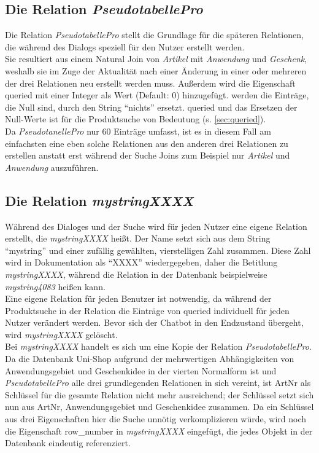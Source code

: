 \subsection{Die Relation \textit{PseudotabellePro}}
\label{sec:PseudotabellePro}
Die Relation \textit{PseudotabellePro} stellt die Grundlage für die späteren Relationen, die während des Dialogs speziell für den Nutzer erstellt werden.\\
Sie resultiert aus einem Natural Join von \textit{Artikel} mit \textit{Anwendung} und \textit{Geschenk}, weshalb sie im Zuge der Aktualität nach einer Änderung in einer oder mehreren der drei Relationen neu erstellt werden muss. Außerdem wird die Eigenschaft queried mit einer Integer als Wert (Default: 0) hinzugefügt. 
werden die Einträge, die Null sind, durch den String "`nichts"' ersetzt. queried und das Ersetzen der Null-Werte ist für die Produktsuche von Bedeutung (s. \ref{sec:queried}).\\
Da \textit{PseudotanellePro} nur 60 Einträge umfasst, ist es in diesem Fall am einfachsten eine eben solche Relationen aus den anderen drei Relationen zu erstellen anstatt erst während der Suche Joins zum Beispiel nur \textit{Artikel} und \textit{Anwendung} auszuführen.\\


\subsection{Die Relation \textit{mystringXXXX}}
\label{sec:mystring}
Während des Dialoges und der Suche wird für jeden Nutzer eine eigene Relation erstellt, die \textit{mystringXXXX} heißt. Der Name setzt sich aus dem String "`mystring"' und einer zufällig gewählten, vierstelligen Zahl zusammen. Diese Zahl wird in Dokumentation als "`XXXX"' wiedergegeben, daher die Betitlung \textit{mystringXXXX}, während die Relation in der Datenbank beispielweise \textit{mystring4083} heißen kann.\\
Eine eigene Relation für jeden Benutzer ist notwendig, da während der Produktsuche in der Relation die Einträge von queried individuell für jeden Nutzer verändert werden. Bevor sich der Chatbot in den Endzustand übergeht, wird \textit{mystringXXXX} gelöscht.\\
Bei \textit{mystringXXXX} handelt es sich um eine Kopie der Relation \textit{PseudotabellePro}. Da die Datenbank Uni-Shop aufgrund der mehrwertigen Abhängigkeiten von Anwendungsgebiet und Geschenkidee in der vierten Normalform ist und \textit{PseudotabellePro} alle drei grundlegenden Relationen in sich vereint, ist ArtNr als Schlüssel für die gesamte Relation nicht mehr ausreichend; der Schlüssel setzt sich nun aus ArtNr, Anwendungsgebiet und Geschenkidee zusammen. Da ein Schlüssel aus drei Eigenschaften hier die Suche unnötig verkomplizieren würde, wird noch die Eigenschaft row\_number in \textit{mystringXXXX} eingefügt, die jedes Objekt in der Datenbank eindeutig referenziert.\\



